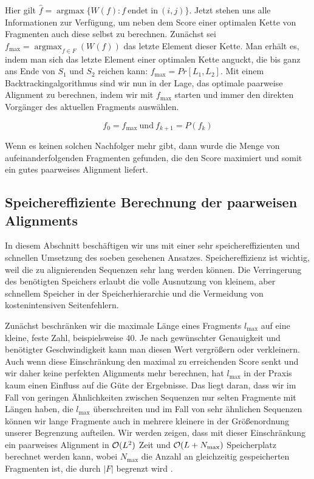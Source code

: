 Hier gilt $\hat{f} = \operatorname{argmax}\{W(f) : f\: \text{endet in}\: (i,j) \}$. Jetzt stehen uns alle Informationen zur Verfügung, um neben dem Score einer optimalen Kette von Fragmenten auch diese selbst zu berechnen. Zunächst sei $f_{\max} = \operatorname{argmax}_{f\in F}(W(f))$ das letzte Element dieser Kette. Man erhält es, indem man sich das letzte Element einer optimalen Kette anguckt, die bis ganz ans Ende von $S_1$ und $S_2$ reichen kann: $f_{\max} = Pr[L_1,L_2]$. Mit einem Backtrackingalgorithmus sind wir nun in der Lage, das optimale paarweise Alignment zu berechnen, indem wir mit $f_{\max}$ starten und immer den direkten Vorgänger des aktuellen Fragments auswählen.

\begin{equation}\label{eq:backtracking}
	f_0 = f_{\max}\: \text{und}\: f_{k+1} = P(f_k)
\end{equation} 

Wenn es keinen solchen Nachfolger mehr gibt, dann wurde die Menge von aufeinanderfolgenden Fragmenten gefunden, die den Score maximiert und somit ein gutes paarweises Alignment liefert.

\subsection{Speichereffiziente Berechnung der paarweisen Alignments}\label{subsec:psa}

In diesem Abschnitt beschäftigen wir uns mit einer sehr speichereffizienten und schnellen Umsetzung des soeben gesehenen Ansatzes. Speichereffizienz ist wichtig, weil die zu alignierenden Sequenzen sehr lang werden können. Die Verringerung des benötigten Speichers erlaubt die volle Ausnutzung von kleinem, aber schnellem Speicher in der Speicherhierarchie und die Vermeidung von kostenintensiven Seitenfehlern.

Zunächst beschränken wir die maximale Länge eines Fragments $l_{\max}$ auf eine kleine, feste Zahl, beispielsweise 40. Je nach gewünschter Genauigkeit und benötigter Geschwindigkeit kann man diesen Wert vergrößern oder verkleinern. Auch wenn diese Einschränkung den maximal zu erreichenden Score senkt und wir daher keine perfekten Alignments mehr berechnen, hat $l_{\max}$ in der Praxis kaum einen Einfluss auf die Güte der Ergebnisse. Das liegt daran, dass wir im Fall von geringen Ähnlichkeiten zwischen Sequenzen nur selten Fragmente mit Längen haben, die $l_{\max}$ überschreiten und im Fall von sehr ähnlichen Sequenzen können wir lange Fragmente auch in mehrere kleinere in der Größenordnung unserer Begrenzung aufteilen. Wir werden zeigen, dass mit dieser Einschränkung ein paarweises Alignment in $\mathcal{O}(L^2)$ Zeit und $\mathcal{O}(L+N_{\max})$ Speicherplatz berechnet werden kann, wobei $N_{\max}$ die Anzahl an gleichzeitig gespeicherten Fragmenten ist, die durch $|F|$ begrenzt wird \cite{m02}.

